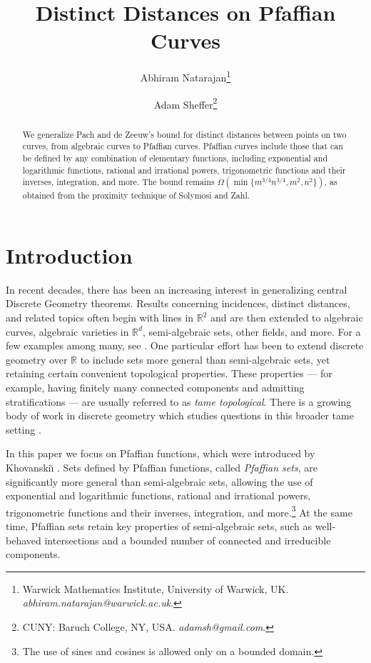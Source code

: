 \documentclass[11pt]{article}
\title{Distinct Distances on Pfaffian Curves}
\author{Abhiram Natarajan\thanks{Warwick Mathematics Institute, University of Warwick, UK.
{\sl abhiram.natarajan@warwick.ac.uk}.}
\and 
Adam Sheffer\thanks{CUNY: Baruch College, NY, USA.
{\sl adamsh@gmail.com}.}
}
\date{}
\theoremstyle{definition}
\newcommand{\RR}{\mathbb R}
\begin{document}
\maketitle

\begin{abstract}
We generalize Pach and de Zeeuw's bound for distinct distances between points on two curves, from algebraic curves to Pfaffian curves.
Pfaffian curves include those that can be defined by any combination of elementary functions, including exponential and logarithmic functions, rational and irrational powers, trigonometric functions and their inverses, integration, and more.
The bound remains $\Omega(\min\{m^{3/4}n^{3/4},m^2,n^2\})$, as obtained from the proximity technique of Solymosi and Zahl.
\end{abstract}

\section{Introduction}

In recent decades, there has been an increasing interest in generalizing central Discrete Geometry theorems. 
Results concerning incidences, distinct distances, and related topics often begin with lines in $\RR^2$ and are then extended to algebraic curves, algebraic varieties in $\RR^d$, semi-algebraic sets, other fields, and more. For a few examples among many, see \cite{AC24,BKT04,RSdZ16,SV08}. One particular effort has been to extend discrete geometry over $\RR$ to include sets more general than semi-algebraic sets, yet retaining certain convenient topological properties. These properties --- for example, having finitely many connected components and admitting stratifications --- are usually referred to as \emph{tame topological}. There is a growing body of work in discrete geometry which studies questions in this broader tame setting \cite{BR18,CGS20,CPS24,CS18,CST21}.

In this paper we focus on Pfaffian functions, which were introduced by Khovanski{\u\i} \cite{Khovanskii91}. Sets defined by Pfaffian functions, called \emph{Pfaffian sets}, are significantly more general than semi-algebraic sets, allowing the use of exponential and logarithmic functions, rational and irrational powers, trigonometric functions and their inverses, integration, and more.\footnote{The use of sines and cosines is allowed only on a bounded domain.} At the same time, Pfaffian sets retain key properties of semi-algebraic sets, such as well-behaved intersections and a bounded number of connected and irreducible components.
\end{document}
